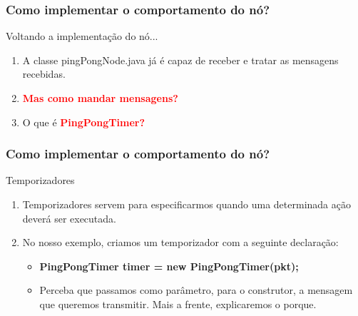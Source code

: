 \documentclass{beamer}
\begin{document}

\begin{frame}
\tiny
	
\end{frame}

\begin{frame}
	\frametitle{Como implementar o comportamento do nó?}
	
	\begin{block}{Voltando a implementação do nó...}
		\begin{enumerate}
			\item A classe pingPongNode.java já é capaz de receber e tratar as mensagens recebidas.
			\item \textcolor{red}{\textbf{Mas como mandar mensagens?}}
			\item O que é \textcolor{red}{\textbf{ PingPongTimer?}}
		\end{enumerate}
			
	\end{block}	

\end{frame}

\begin{frame}
	\frametitle{Como implementar o comportamento do nó?}
	
	\begin{block}{Temporizadores}
		\begin{enumerate}
			\item Temporizadores servem para especificarmos quando uma determinada ação deverá ser executada.
			\item No nosso exemplo, criamos um temporizador com a seguinte declaração:
			\begin{itemize}
				\item \textbf{PingPongTimer timer = new PingPongTimer(pkt);}
				\item Perceba que passamos como parâmetro, para o construtor, a mensagem que queremos transmitir. Mais a frente, explicaremos o porque.
			\end{itemize}
		\end{enumerate}
			
	\end{block}	
	


\end{frame}
\end{document}
